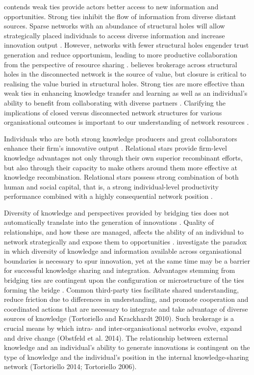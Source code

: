 \citet{granovetter1973strength} contends weak ties provide actors better access to new information and opportunities. Strong ties inhibit the flow of information from diverse distant sources. Sparse networks with an abundance of structural holes will allow strategically placed individuals to access diverse information and increase innovation output \citep{burt2004structural}. However, networks with fewer structural holes engender trust generation and reduce opportunism, leading to more productive collaboration from the perspective of resource sharing \citep{ahuja2000collaboration}. \citet{burt2001structural} believes brokerage across structural holes in the disconnected network is the source of value, but closure is critical to realising the value buried in structural holes. Strong ties are more effective than weak ties in enhancing knowledge transfer and learning as well as an individual’s ability to benefit from collaborating with diverse partners \citep{rost2011strength,phelps2012knowledge}. Clarifying the implications of closed versus disconnected network structures for various organisational outcomes is important to our understanding of network resources \citep{ahuja2000collaboration}. \medskip

Individuals who are both strong knowledge producers and great collaborators enhance their firm’s innovative output \citep{grigoriou2014structural}. Relational stars provide firm-level knowledge advantages not only through their own superior recombinant efforts, but also through their capacity to make others around them more effective at knowledge recombination. Relational stars possess strong combination of both human and social capital, that is, a strong individual-level productivity performance combined with a highly consequential network position \citep{grigoriou2014structural}. \medskip

Diversity of knowledge and perspectives provided by bridging ties does not automatically translate into the generation of innovations \citep{ahuja2000collaboration}. Quality of relationships, and how these are managed, affects the ability of an individual to network strategically and expose them to opportunities \citep{uzzi1997social}. \citet{tortoriello2010activating} investigate the paradox in which diversity of knowledge and information available across organisational boundaries is necessary to spur innovation, yet at the same time may be a barrier for successful knowledge sharing and integration. Advantages stemming from bridging ties are contingent upon the configuration or microstructure of the ties forming the bridge \citep{tortoriello2010activating,tortoriello2015social}. Common third-party ties facilitate shared understanding, reduce friction due to differences in understanding, and promote cooperation and coordinated actions that are necessary to integrate and take advantage of diverse sources of knowledge (Tortoriello and Krackhardt 2010). Such brokerage is a crucial means by which intra- and inter-organisational networks evolve, expand and drive change (Obstfeld et al. 2014). The relationship between external knowledge and an individual’s ability to generate innovations is contingent on the type of knowledge and the individual’s position in the internal knowledge-sharing network (Tortoriello 2014; Tortoriello 2006). 

